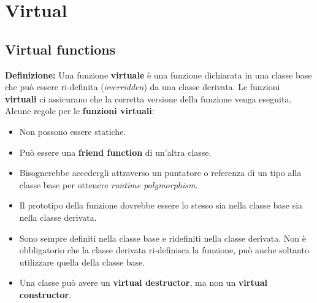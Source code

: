 

\newpage

\section{Virtual}

\subsection{Virtual functions}

\textsf{\small \textbf{Definizione:} Una funzione \textbf{virtuale} è una funzione dichiarata in una classe base che può essere ri-definita (\emph{overridden}) da una classe derivata. Le funzioni \textbf{virtuali} ci assicurano che la corretta versione della funzione venga eseguita.} \\

\textsf{\small Alcune regole per le \textbf{funzioni virtuali}: }

\begin{itemize}
	\item \textsf{\small Non possono essere statiche.}
	\item \textsf{\small Può essere una \textbf{friend function} di un'altra classe.}
	\item \textsf{\small Bisognerebbe accedergli attraverso un puntatore o referenza di un tipo alla classe base per ottenere \emph{runtime polymorphism}.}
	\item \textsf{\small Il prototipo della funzione dovrebbe essere lo stesso sia nella classe base sia nella classe derivata.}
	\item \textsf{\small Sono sempre definiti nella classe base e ridefiniti nella classe derivata. Non è obbligatorio che la classe derivata ri-definisca la funzione, può anche soltanto utilizzare quella della classe base.}
	\item \textsf{\small Una classe può avere un \textbf{virtual destructor}, ma non un \textbf{virtual constructor}.}
\end{itemize}

